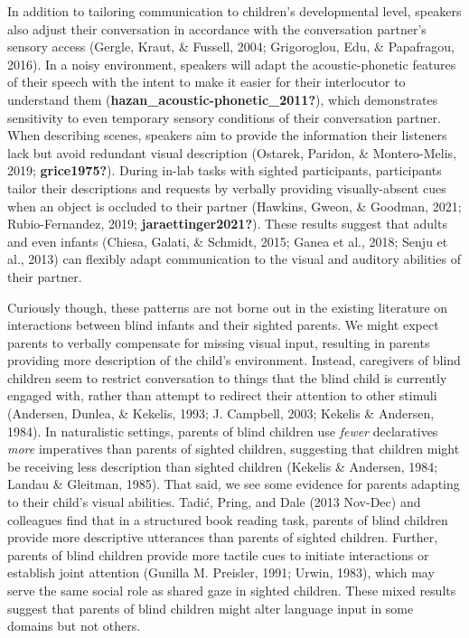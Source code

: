 \documentclass[
  man,floatsintext]{apa6}
\begin{document}
In addition to tailoring communication to children's developmental level, speakers also adjust their conversation in accordance with the conversation partner's sensory access (Gergle, Kraut, \& Fussell, 2004; Grigoroglou, Edu, \& Papafragou, 2016). In a noisy environment, speakers will adapt the acoustic-phonetic features of their speech with the intent to make it easier for their interlocutor to understand them (\textbf{hazan\_acoustic-phonetic\_2011?}), which demonstrates sensitivity to even temporary sensory conditions of their conversation partner. When describing scenes, speakers aim to provide the information their listeners lack but avoid redundant visual description (Ostarek, Paridon, \& Montero-Melis, 2019; \textbf{grice1975?}). During in-lab tasks with sighted participants, participants tailor their descriptions and requests by verbally providing visually-absent cues when an object is occluded to their partner (Hawkins, Gweon, \& Goodman, 2021; Rubio-Fernandez, 2019; \textbf{jaraettinger2021?}). These results suggest that adults and even infants (Chiesa, Galati, \& Schmidt, 2015; Ganea et al., 2018; Senju et al., 2013) can flexibly adapt communication to the visual and auditory abilities of their partner.

Curiously though, these patterns are not borne out in the existing literature on interactions between blind infants and their sighted parents. We might expect parents to verbally compensate for missing visual input, resulting in parents providing more description of the child's environment. Instead, caregivers of blind children seem to restrict conversation to things that the blind child is currently engaged with, rather than attempt to redirect their attention to other stimuli (Andersen, Dunlea, \& Kekelis, 1993; J. Campbell, 2003; Kekelis \& Andersen, 1984). In naturalistic settings, parents of blind children use \emph{fewer} declaratives \emph{more} imperatives than parents of sighted children, suggesting that children might be receiving less description than sighted children (Kekelis \& Andersen, 1984; Landau \& Gleitman, 1985). That said, we see some evidence for parents adapting to their child's visual abilities. Tadić, Pring, and Dale (2013 Nov-Dec) and colleagues find that in a structured book reading task, parents of blind children provide more descriptive utterances than parents of sighted children. Further, parents of blind children provide more tactile cues to initiate interactions or establish joint attention (Gunilla M. Preisler, 1991; Urwin, 1983), which may serve the same social role as shared gaze in sighted children. These mixed results suggest that parents of blind children might alter language input in some domains but not others.
\end{document}
